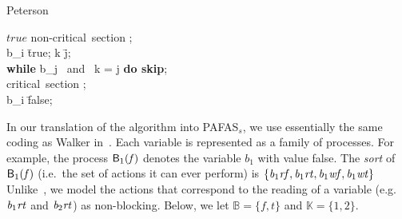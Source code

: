 \documentclass[copyright,creativecommons]{eptcs}
\newcommand{\bool}{{\mathbb B}}
\newcommand{\kvalues}{{\mathbb K}}
\newcommand{\fa}{\mathit{f}}
\newcommand{\tr}{\mathit{t}}
\newcommand{\Bv}{{\sf B}}
\newcommand{\rtb}[1]{{\it b_{{\rm #1}}rt}}
\newcommand{\rfb}[1]{{\it b_{{\rm #1}}rf}}
\newcommand{\wtb}[1]{{\it b_{{\rm #1}}wt}}
\newcommand{\wfb}[1]{{\it b_{{\rm #1}}wf}}
\begin{document}
\vspace{0.2cm}
\small
\begin{algorithm}{Peterson}{}
\begin{WHILE}{$true$}
\langle \mbox{non-critical section} \rangle; \\
b_i \= true; \quad k \= j;\\
{\bf while} \; b_j \mbox{ and } k = j \; {\bf do \; skip};\\
\langle \mbox{critical section} \rangle; \\
b_i \= false;
\end{WHILE}
\end{algorithm}
\normalsize
In our translation of the algorithm into PAFAS$_s$, we use essentially
the same coding as Walker in~\cite{Walker89}. Each variable is represented
as a family of processes. For example, the process $\Bv_1(\fa)$ denotes the
variable $b_1$ with value false. The {\em sort} of $\Bv_1(\fa)$ (i.e.\ the
set of actions it can ever perform) is $\{\rfb{1},\rtb{1}, \wfb{1},
\wtb{1}\}$ Unlike~\cite{Walker89}, we model the actions that correspond to the reading
of a variable (e.g.\ $\rtb{1}$ and $\rtb{2}$) as non-blocking. Below, we
let $\bool=\{\fa, \tr\}$ and $\kvalues=\{1,2\}$.
\end{document}
